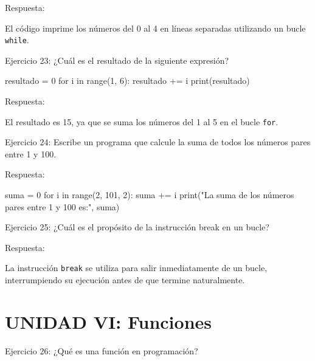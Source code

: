 \documentclass[
  a4paper,
  onepage,
  openany]{scrreprt}
\newenvironment{Shaded}{\begin{snugshade}}{\end{snugshade}}
\newcommand{\BuiltInTok}[1]{\textcolor[rgb]{0.00,0.23,0.31}{#1}}
\newcommand{\ControlFlowTok}[1]{\textcolor[rgb]{0.00,0.23,0.31}{#1}}
\newcommand{\DecValTok}[1]{\textcolor[rgb]{0.68,0.00,0.00}{#1}}
\newcommand{\KeywordTok}[1]{\textcolor[rgb]{0.00,0.23,0.31}{#1}}
\newcommand{\NormalTok}[1]{\textcolor[rgb]{0.00,0.23,0.31}{#1}}
\newcommand{\OperatorTok}[1]{\textcolor[rgb]{0.37,0.37,0.37}{#1}}
\newcommand{\StringTok}[1]{\textcolor[rgb]{0.13,0.47,0.30}{#1}}
\begin{document}
Respuesta:

El código imprime los números del 0 al 4 en líneas separadas utilizando
un bucle \texttt{while}.

Ejercicio 23: ¿Cuál es el resultado de la siguiente expresión?

\begin{Shaded}
\begin{Highlighting}[]
\NormalTok{resultado }\OperatorTok{=} \DecValTok{0}
\ControlFlowTok{for}\NormalTok{ i }\KeywordTok{in} \BuiltInTok{range}\NormalTok{(}\DecValTok{1}\NormalTok{, }\DecValTok{6}\NormalTok{):}
\NormalTok{    resultado }\OperatorTok{+=}\NormalTok{ i}
\BuiltInTok{print}\NormalTok{(resultado)}
\end{Highlighting}
\end{Shaded}

Respuesta:

El resultado es 15, ya que se suma los números del 1 al 5 en el bucle
\texttt{for}.

Ejercicio 24: Escribe un programa que calcule la suma de todos los
números pares entre 1 y 100.

Respuesta:

\begin{Shaded}
\begin{Highlighting}[]
\NormalTok{suma }\OperatorTok{=} \DecValTok{0}
\ControlFlowTok{for}\NormalTok{ i }\KeywordTok{in} \BuiltInTok{range}\NormalTok{(}\DecValTok{2}\NormalTok{, }\DecValTok{101}\NormalTok{, }\DecValTok{2}\NormalTok{):}
\NormalTok{    suma }\OperatorTok{+=}\NormalTok{ i}
\BuiltInTok{print}\NormalTok{(}\StringTok{"La suma de los números pares entre 1 y 100 es:"}\NormalTok{, suma)}
\end{Highlighting}
\end{Shaded}

Ejercicio 25: ¿Cuál es el propósito de la instrucción break en un bucle?

Respuesta:

La instrucción \texttt{break} se utiliza para salir inmediatamente de un
bucle, interrumpiendo su ejecución antes de que termine naturalmente.

\hypertarget{unidad-vi-funciones-1}{%
\section{UNIDAD VI: Funciones}\label{unidad-vi-funciones-1}}

Ejercicio 26: ¿Qué es una función en programación?
\end{document}
